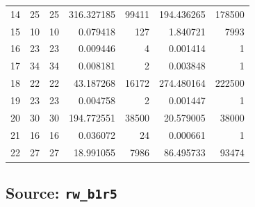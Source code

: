 \documentclass{article}
\begin{document}
\begin{landscape}
\begin{longtable}{rrrrrrr}
14 & 25 & 25 & 316.327185 & 99411 & 194.436265 & 178500 \\
15 & 10 & 10 & 0.079418 & 127 & 1.840721 & 7993 \\
16 & 23 & 23 & 0.009446 & 4 & 0.001414 & 1 \\
17 & 34 & 34 & 0.008181 & 2 & 0.003848 & 1 \\
18 & 22 & 22 & 43.187268 & 16172 & 274.480164 & 222500 \\
19 & 23 & 23 & 0.004758 & 2 & 0.001447 & 1 \\
20 & 30 & 30 & 194.772551 & 38500 & 20.579005 & 38000 \\
21 & 16 & 16 & 0.036072 & 24 & 0.000661 & 1 \\
22 & 27 & 27 & 18.991055 & 7986 & 86.495733 & 93474 \\
\end{longtable}

\subsection*{Source: \texttt{rw\_b1r5}}


\end{landscape}
\end{document}
